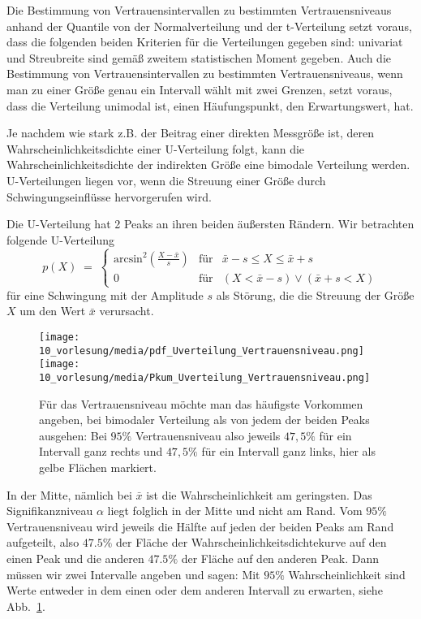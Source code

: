 Die Bestimmung von Vertrauensintervallen zu bestimmten Vertrauensniveaus anhand der Quantile
von der Normalverteilung und der t-Verteilung setzt voraus, dass die folgenden beiden Kriterien für die Verteilungen gegeben sind: univariat und Streubreite sind gemäß zweitem statistischen Moment gegeben. Auch die Bestimmung von Vertrauensintervallen zu bestimmten Vertrauensniveaus, wenn man
zu einer Größe genau ein Intervall wählt mit zwei Grenzen, setzt voraus, dass die Verteilung unimodal ist, einen Häufungspunkt, den Erwartungswert, hat.

Je nachdem wie stark z.B. der Beitrag einer direkten Messgröße ist, deren Wahrscheinlichkeitsdichte
einer U-Verteilung folgt, kann die Wahrscheinlichkeitsdichte der indirekten Größe
eine bimodale Ver\-teilung werden. U-Verteilungen liegen vor, wenn die Streuung einer Größe
durch Schwingungseinflüsse hervorgerufen wird.

Die U-Verteilung hat 2 Peaks an ihren beiden äußersten Rändern.
Wir betrachten folgende U-Verteilung
\begin{equation}
p(X) \; = \; \left\{\begin{array}{lll}
\mathrm{arcsin}^2\left(\frac{X - \bar x}{s}\right) & \text{für} & \bar x - s  \leq X \leq \bar x + s\\
0 & \text{für} & (X < \bar x - s) \vee (\bar x + s < X)
\end{array}\right.
\label{uverteilung}
\end{equation}
für eine Schwingung mit der Amplitude $s$ als Störung, die die Streuung der Größe $X$
um den Wert $\bar x$ verursacht.
\begin{figure}
	\begin{center}
 		\texttt{[image: 10\_vorlesung/media/pdf\_Uverteilung\_Vertrauensniveau.png]}
 		\hspace{2mm}
	\texttt{[image: 10\_vorlesung/media/Pkum\_Uverteilung\_Vertrauensniveau.png]}
		\caption{Für das Vertrauensniveau möchte man das häufigste Vorkommen angeben, bei
			bimodaler Verteilung als von jedem der beiden Peaks ausgehen: Bei $95 \%$
			Vertrauensniveau also jeweils $47,5 \%$ für ein Intervall ganz rechts und
			$47,5 \%$ für ein Intervall ganz links, hier als gelbe Flächen markiert.}
		\label{Uverteilungsquantile}
	\end{center}
\end{figure}
In der Mitte, nämlich bei $\bar x$ ist die Wahrscheinlichkeit am geringsten.
Das Signifikanzniveau $\alpha$ liegt folglich in der Mitte und nicht am Rand.
Vom $95 \%$ Vertrauensniveau wird jeweils die Hälfte auf jeden der beiden
Peaks am Rand aufgeteilt, also $47.5 \%$ der Fläche der
Wahrscheinlichkeitsdichtekurve auf den einen Peak und die anderen $47.5 \%$ der Fläche auf den anderen
Peak. Dann müssen wir zwei Intervalle angeben und sagen: Mit $95 \%$ Wahrscheinlichkeit sind
Werte entweder in dem einen oder dem anderen Intervall zu erwarten, siehe Abb.~\ref{Uverteilungsquantile}.

